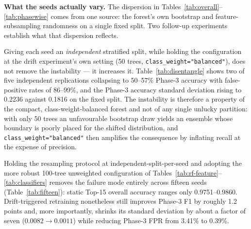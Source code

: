 \documentclass[11pt,a4paper]{article}
\begin{document}
\medskip
\noindent\textbf{What the seeds actually vary.} The dispersion in
Tables~\ref{tab:overall}--\ref{tab:phasewise} comes from one source: the
forest's own bootstrap and feature-subsampling randomness on a single fixed
split. Two follow-up experiments establish what that dispersion reflects.

Giving each seed an \emph{independent} stratified split, while holding the
configuration at the drift experiment's own setting (50 trees,
\texttt{class\_weight="balanced"}), does not remove the instability --- it
increases it. Table~\ref{tab:disentangle} shows two of five independent
replications collapsing to 50--57\% Phase-3 accuracy with false-positive rates
of 86--99\%, and the Phase-3 accuracy standard deviation rising to 0.2236
against 0.1816 on the fixed split. The instability is therefore a property of
the compact, class-weight-balanced forest and not of any single unlucky
partition: with only 50 trees an unfavourable bootstrap draw yields an ensemble
whose boundary is poorly placed for the shifted distribution, and
\texttt{class\_weight="balanced"} then amplifies the consequence by inflating
recall at the expense of precision.

\begin{table}[!ht]
\centering
\caption{Phase-3 performance of the static Top-15 detector
(50 trees, class-weight-balanced) under five \emph{independent}
stratified resamplings. Each row is a different train--test partition
and a different forest initialization.}
\label{tab:disentangle}
\small
{}
\end{table}

Holding the resampling protocol at independent-split-per-seed and adopting the
more robust 100-tree unweighted configuration of
Tables~\ref{tab:rf-feature}--\ref{tab:classifiers} removes the failure mode
entirely across fifteen seeds (Table~\ref{tab:fifteen}): static Top-15 overall
accuracy ranges only 0.9751--0.9860. Drift-triggered retraining nonetheless
still improves Phase-3 F1 by roughly 1.2 points and, more importantly, shrinks
its standard deviation by about a factor of seven ($0.0082 \rightarrow 0.0011$)
while reducing Phase-3 FPR from 3.41\% to 0.39\%.
\end{document}
